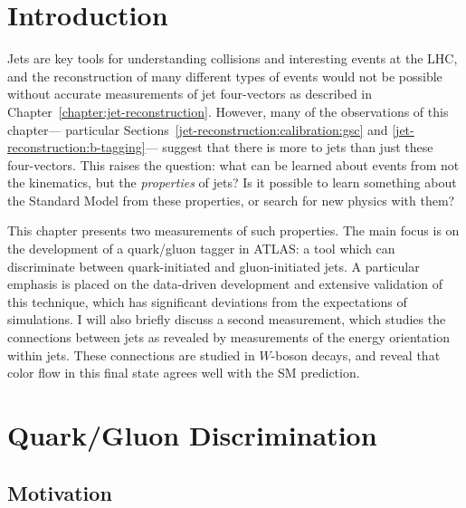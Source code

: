 \label{chapter:color}
\section{Introduction}

Jets are key tools for understanding collisions and interesting events at the LHC, and the reconstruction of many different types of events would not be possible without accurate measurements of jet four-vectors as described in Chapter~\ref{chapter:jet-reconstruction}. However, many of the observations of this chapter--- particular Sections~\ref{jet-reconstruction:calibration:gsc} and \ref{jet-reconstruction:b-tagging}--- suggest that there is more to jets than just these four-vectors. This raises the question: what can be learned about events from not the kinematics, but the \textit{properties} of jets? Is it possible to learn something about the Standard Model from these properties, or search for new physics with them?

This chapter presents two measurements of such properties. The main focus is on the development of a quark/gluon tagger in ATLAS: a tool which can discriminate between quark-initiated and gluon-initiated jets. A particular emphasis is placed on the data-driven development and extensive validation of this technique, which has significant deviations from the expectations of simulations. I will also briefly discuss a second measurement, which studies the connections between jets as revealed by measurements of the energy orientation within jets. These connections are studied in $W$-boson decays, and reveal that color flow in this final state agrees well with the SM prediction.

\section{Quark/Gluon Discrimination}
\label{jet-reconstruction:qg}
\subsection{Motivation}
\label{jet-reconstruction:qg:overview}

